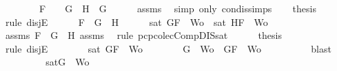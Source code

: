 \begin{isabellebody}
\ \ \ \ \ \ \ \ F\ {\isacharequal}\ \isactrlbold {\isasymnot}\ {\isacharparenleft}\isactrlbold {\isasymnot}\ G{\isacharparenright}\ {\isasymand}\ H\ {\isacharequal}\ G{\isacharparenright}{\isachardoublequoteclose}\isanewline
\ \ \ \ \isamarkupfalse%
\ assms{\isacharparenleft}{}{\isacharparenright}\ \isamarkupfalse%
\ {\isacharparenleft}simp\ only{\isacharcolon}\ con{\isacharunderscore}dis{\isacharunderscore}simps{\isacharparenleft}{}{\isacharparenright}{\isacharparenright}\isanewline
\ \ \isamarkupfalse%
\ {\isacharquery}thesis\isanewline
\ \ \isamarkupfalse%
\ {\isacharparenleft}rule\ disjE{\isacharparenright}\isanewline
\ \ \ \ \isamarkupfalse%
\ {\isachardoublequoteopen}F\ {\isacharequal}\ G\ \isactrlbold {\isasymor}\ H{\isachardoublequoteclose}\isanewline
\ \ \ \ \isamarkupfalse%
\ {\isachardoublequoteopen}sat\ {\isacharparenleft}{\isacharbraceleft}G{\isacharcomma}F{\isacharbraceright}\ {\isasymunion}\ Wo{\isacharparenright}\ {\isasymor}\ sat\ {\isacharparenleft}{\isacharbraceleft}H{\isacharcomma}F{\isacharbraceright}\ {\isasymunion}\ Wo{\isacharparenright}{\isachardoublequoteclose}\isanewline
\ \ \ \ \ \ \isamarkupfalse%
\ assms{\isacharparenleft}{}{\isacharparenright}\ {\isacartoucheopen}F\ {\isacharequal}\ G\ \isactrlbold {\isasymor}\ H{\isacartoucheclose}\ assms{\isacharparenleft}{}{\isacharcomma}{}{\isacharcomma}{}{\isacharparenright}\ \isamarkupfalse%
\ {\isacharparenleft}rule\ pcp{\isacharunderscore}colecComp{\isacharunderscore}DIS{\isacharunderscore}sat{}{\isacharparenright}\isanewline
\ \ \ \ \isamarkupfalse%
\ {\isacharquery}thesis\isanewline
\ \ \ \ \isamarkupfalse%
\ {\isacharparenleft}rule\ disjE{\isacharparenright}\isanewline
\ \ \ \ \ \ \isamarkupfalse%
\ {\isachardoublequoteopen}sat\ {\isacharparenleft}{\isacharbraceleft}G{\isacharcomma}F{\isacharbraceright}\ {\isasymunion}\ Wo{\isacharparenright}{\isachardoublequoteclose}\isanewline
\ \ \ \ \ \ \isamarkupfalse%
\ {\isachardoublequoteopen}{\isacharbraceleft}G{\isacharbraceright}\ {\isasymunion}\ Wo\ {\isasymsubseteq}\ {\isacharbraceleft}G{\isacharcomma}F{\isacharbraceright}\ {\isasymunion}\ Wo{\isachardoublequoteclose}\isanewline
\ \ \ \ \ \ \ \ \isamarkupfalse%
\ blast\isanewline
\ \ \ \ \ \ \isamarkupfalse%
\ \isamarkupfalse%
\ {\isachardoublequoteopen}sat{\isacharparenleft}{\isacharbraceleft}G{\isacharbraceright}\ {\isasymunion}\ Wo{\isacharparenright}{\isachardoublequoteclose}\isanewline

\end{isabellebody}
